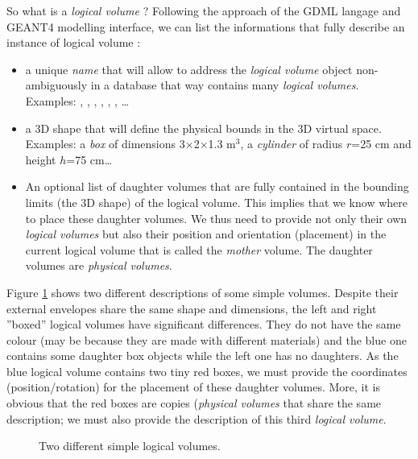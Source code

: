 So what is a \emph{logical  volume} ? Following the approach of the GDML langage
and GEANT4 modelling interface, we can list the informations that fully describe
an instance of logical volume :

\begin{itemize}

\item   a  unique  \emph{name}   that  will   allow  to   address  the
  \emph{logical volume}  object non-ambiguously in a  database that way contains
  many \emph{logical  volumes}.\\  \pn  Examples:  ,  ,
  ,     ,     ,    ,
  \dots

\item  a 3D  shape that  will  define the  physical bounds  in the  3D
  virtual   space.\\  \pn   Examples:  a   \emph{box}   of  dimensions
  3$\times$2$\times$1.3 m$^3$,  a \emph{cylinder} of  radius $r$=25 cm
  and height $h$=75 cm\dots

\item An optional list of daughter volumes that are fully contained in
  the  bounding limits  (the 3D  shape)  of the  logical volume.  This
  implies that we know where  to place these daughter volumes. We thus
  need to provide  not only their own \emph{logical  volumes} but also
  their position  and orientation  (placement) in the  current logical
  volume that is called the \emph{mother} volume. The daughter volumes
  are \emph{physical volumes}.

\end{itemize}

Figure \ref{fig:lv:1} shows two  different descriptions of some simple
volumes.  Despite  their external envelopes  share the same  shape and
dimensions,  the  left  and   right  ''boxed''  logical  volumes  have
significant differences.   They do  not have the  same colour  (may be
because  they are  made with  different  materials) and  the blue  one
contains  some  daughter  box  objects  while  the  left  one  has  no
daughters. As the blue logical volume contains two tiny red boxes, we must
provide the coordinates (position/rotation) for the placement of these
daughter volumes. More, it is obvious that the red boxes are copies
(\emph{physical volumes} that share the same description; we must
also provide the description of this third \emph{logical volume}.

\begin{figure}[h]
\begin{center}
\scalebox{0.75}{}
\end{center}
\caption{Two  different  simple  logical  volumes.}\label{fig:lv:1}
\end{figure}

